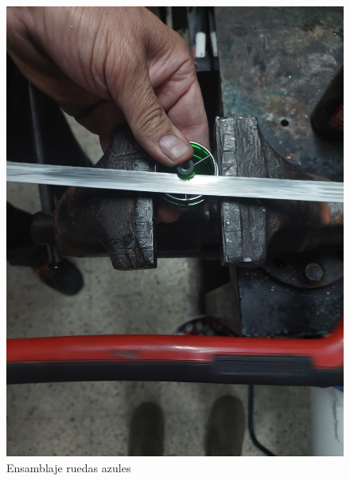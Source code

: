 \begin{figure}[ht!]
\begin{minipage}{0.45\linewidth}
		\includegraphics[width=\linewidth]{figs/cap5/creacionra2.jpeg}
		\caption*{\centering}
	\end{minipage}
	\caption{Ensamblaje ruedas azules}
	\label{fig:rae}
\end{figure}


